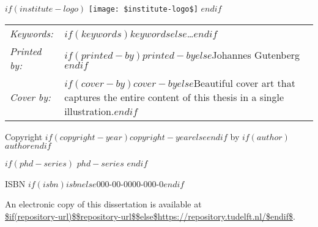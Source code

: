 \begin{titlepage}
    \vfill
    \begin{center}
$if(institute-logo)$
        \texttt{[image: \$institute-logo\$]}
$endif$
    \end{center}
    \vfill

    \noindent
    \begin{tabular}{@{}p{}@{}p{}@{}}
        \textit{Keywords:}    & $if(keywords)$$keywords$$else$\ldots$endif$                                                                                        \\[\medskipamount]
        \textit{Printed by:}   & $if(printed-by)$$printed-by$$else$Johannes Gutenberg$endif$                                                                            \\[\medskipamount]
        \textit{Cover by:} & $if(cover-by)$$cover-by$$else$Beautiful cover art that captures the entire content of this thesis in a single illustration.$endif$
    \end{tabular}

    \vspace{4\bigskipamount}

    \noindent Copyright \textcopyright{} $if(copyright-year)$$copyright-year$$else$\the\year{}$endif$ by $if(author)$$author$$endif$

$if(phd-series)$
    \medskip
    \noindent $phd-series$
$endif$

    \medskip
    \noindent ISBN $if(isbn)$$isbn$$else$000-00-0000-000-0$endif$

    \medskip
    \noindent An electronic copy of this dissertation is available at\\
    \url{$if(repository-url)$$repository-url$$else$https://repository.tudelft.nl/$endif$}.

\end{titlepage}
